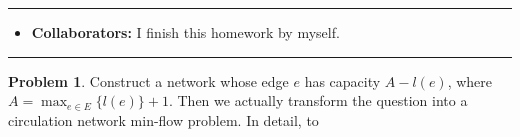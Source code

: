\documentclass[a4paper]{article}
\theoremstyle{definition}
\newtheorem{problem}{Problem}
\theoremstyle{plain}
\newcommand{\dps}{\displaystyle}
\numberwithin{equation}{problem}
\begin{document}
\courseheader
{}
\rule{\textwidth}{1pt}
\begin{itemize}
\item {\bf Collaborators: \/}
  I finish this homework by myself. 
\end{itemize}
\rule{\textwidth}{1pt}

\vspace{2em}
 
\sloppy
{}

\begin{problem}
    Construct a network whose edge  $ e $  has capacity  $ A-l(e) $, where  $ A=\dps\max_{e\in E}\{l(e)\}+1  $. Then we actually transform the question into a circulation network min-flow problem. In detail, to 
\end{problem}
\end{document}
